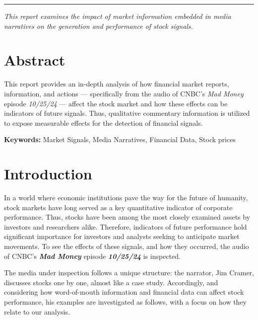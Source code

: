 \documentclass[12pt,a4paper]{article}
\begin{document}
\begin{titlepage}
    \vspace{1.2cm}

    {\color{SUblue}\rule{\textwidth}{0.8pt}}\par
    \vspace{0.2cm}
   {\small \textit{This report examines the impact of market information embedded in media narratives on the generation and performance of stock signals.}}

\end{titlepage}

\setcounter{page}{1}

\newpage
\section*{Abstract}
This report provides an in-depth analysis of how financial market reports, information, and actions --- specifically from the audio of CNBC's \textit{Mad Money} episode \textit{10/25/24} --- affect the stock market and how these effects can be indicators of future signals. Thus, qualitative commentary information is utilized to expose measurable effects for the detection of financial signals.

\vspace{1cm}
\textbf{Keywords:} Market Signals, Media Narratives, Financial Data, Stock prices

\section*{Introduction}
In a world where economic institutions pave the way for the future of humanity, 
stock markets have long served as a key quantitative indicator of corporate performance. 
Thus, stocks have been among the most closely examined assets by investors and researchers alike. 
Therefore, indicators of future performance hold significant importance for investors and analysts seeking to anticipate market movements. 
To see the effects of these signals, and how they occurred, the audio of CNBC's \textbf{\textit{Mad Money}} episode \textit{\textbf{10/25/24}} is inspected.

\vspace{1.1cm}
The media under inspection follows a unique structure: the narrator, Jim Cramer, 
discusses stocks one by one, almost like a case study. 
Accordingly, and considering how word-of-mouth information and financial data 
can affect stock performance, his examples are investigated as follows, 
with a focus on how they relate to our analysis.
\vspace{1.1cm}
\end{document}
